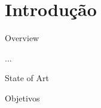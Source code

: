 \section{Introdução}


\begin{frame}{Overview}

    ...

\end{frame}

\begin{frame}{State of Art}

\end{frame}

\begin{frame}{Objetivos}

\end{frame}